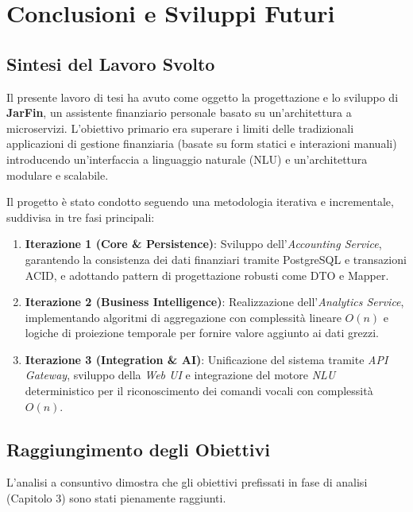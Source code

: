 \chapter{Conclusioni e Sviluppi Futuri}
\label{chap:conclusioni}

\section{Sintesi del Lavoro Svolto}

Il presente lavoro di tesi ha avuto come oggetto la progettazione e lo sviluppo di \textbf{JarFin}, un assistente finanziario personale basato su un'architettura a microservizi.
L'obiettivo primario era superare i limiti delle tradizionali applicazioni di gestione finanziaria (basate su form statici e interazioni manuali) introducendo un'interfaccia a linguaggio naturale (NLU) e un'architettura modulare e scalabile.

Il progetto è stato condotto seguendo una metodologia iterativa e incrementale, suddivisa in tre fasi principali:
\begin{enumerate}
    \item \textbf{Iterazione 1 (Core \& Persistence)}: Sviluppo dell'\textit{Accounting Service}, garantendo la consistenza dei dati finanziari tramite PostgreSQL e transazioni ACID, e adottando pattern di progettazione robusti come DTO e Mapper.
    \item \textbf{Iterazione 2 (Business Intelligence)}: Realizzazione dell'\textit{Analytics Service}, implementando algoritmi di aggregazione con complessità lineare $O(n)$ e logiche di proiezione temporale per fornire valore aggiunto ai dati grezzi.
    \item \textbf{Iterazione 3 (Integration \& AI)}: Unificazione del sistema tramite \textit{API Gateway}, sviluppo della \textit{Web UI} e integrazione del motore \textit{NLU} deterministico per il riconoscimento dei comandi vocali con complessità $O(n)$.
\end{enumerate}

\newpage
\section{Raggiungimento degli Obiettivi}

L'analisi a consuntivo dimostra che gli obiettivi prefissati in fase di analisi (Capitolo 3) sono stati pienamente raggiunti.

